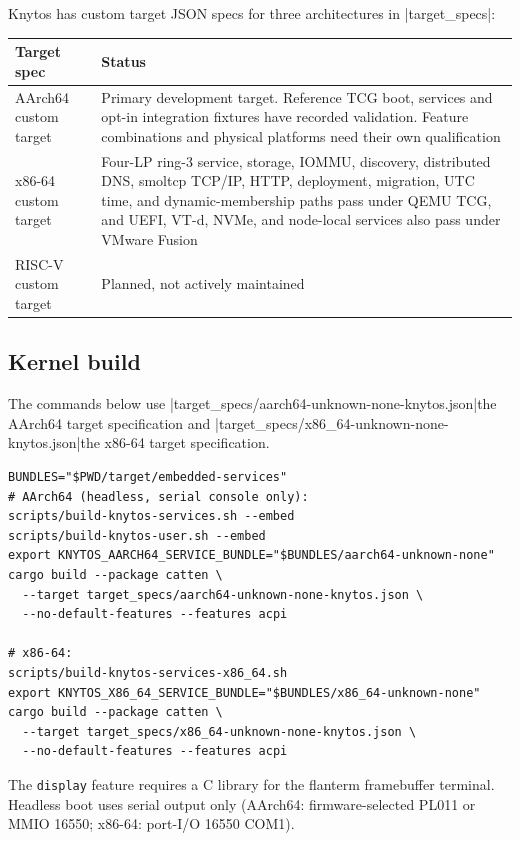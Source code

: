 Knytos has custom target JSON specs for three architectures in
\repodir|target_specs|:

\begin{longtable}{|p{5.8cm}|p{6.4cm}|}
\hline
\textbf{Target spec} & \textbf{Status} \\
\hline
AArch64 custom target & Primary development target. Reference TCG boot,
    services and opt-in integration fixtures have recorded validation.
    Feature combinations and physical platforms need their own qualification \\
x86-64 custom target & Four-LP ring-3 service, storage, IOMMU,
    discovery, distributed DNS, smoltcp TCP/IP, HTTP, deployment, migration,
    UTC time, and dynamic-membership paths pass under QEMU TCG, and UEFI, VT-d,
    NVMe, and node-local services also pass under VMware Fusion \\
RISC-V custom target & Planned, not actively
    maintained \\
\hline
\end{longtable}

\subsection{Kernel build}

The commands below use
\repofiletext|target_specs/aarch64-unknown-none-knytos.json|{the AArch64 target specification}
and
\repofiletext|target_specs/x86_64-unknown-none-knytos.json|{the x86-64 target specification}.

\begin{verbatim}
BUNDLES="$PWD/target/embedded-services"
# AArch64 (headless, serial console only):
scripts/build-knytos-services.sh --embed
scripts/build-knytos-user.sh --embed
export KNYTOS_AARCH64_SERVICE_BUNDLE="$BUNDLES/aarch64-unknown-none"
cargo build --package catten \
  --target target_specs/aarch64-unknown-none-knytos.json \
  --no-default-features --features acpi

# x86-64:
scripts/build-knytos-services-x86_64.sh
export KNYTOS_X86_64_SERVICE_BUNDLE="$BUNDLES/x86_64-unknown-none"
cargo build --package catten \
  --target target_specs/x86_64-unknown-none-knytos.json \
  --no-default-features --features acpi
\end{verbatim}

The \texttt{display} feature requires a C library for the flanterm
framebuffer terminal. Headless boot uses serial output only (AArch64:
firmware-selected PL011 or MMIO 16550; x86-64: port-I/O 16550 COM1).

